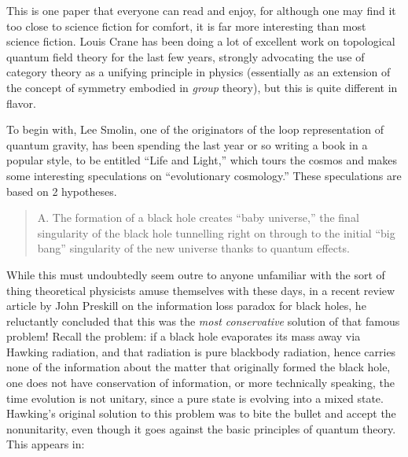 \documentclass[12pt]{article}
\def\tightlist{}
\renewcommand{\texttt}[1]{%
  \begingroup
  \ttfamily
  \begingroup\lccode`~=`/\lowercase{\endgroup\def~}{/\discretionary{}{}{}}%
  \begingroup\lccode`~=`[\lowercase{\endgroup\def~}{[\discretionary{}{}{}}%
  \begingroup\lccode`~=`.\lowercase{\endgroup\def~}{.\discretionary{}{}{}}%
  \catcode`/=\active\catcode`[=\active\catcode`.=\active
  \scantokens{#1\noexpand}%
  \endgroup
}
\begin{document}
\noindent
This is one paper that everyone can read and enjoy, for although one may
find it too close to science fiction for comfort, it is far more
interesting than most science fiction. Louis Crane has been doing a lot
of excellent work on topological quantum field theory for the last few
years, strongly advocating the use of category theory as a unifying
principle in physics (essentially as an extension of the concept of
symmetry embodied in \emph{group} theory), but this is quite different
in flavor.

To begin with, Lee Smolin, one of the originators of the loop
representation of quantum gravity, has been spending the last year or so
writing a book in a popular style, to be entitled ``Life and Light,''
which tours the cosmos and makes some interesting speculations on
``evolutionary cosmology.'' These speculations are based on 2
hypotheses.

\begin{quote}
A. The formation of a black hole creates ``baby universe,'' the final
singularity of the black hole tunnelling right on through to the initial
``big bang'' singularity of the new universe thanks to quantum effects.
\end{quote}

While this must undoubtedly seem outre to anyone unfamiliar with the
sort of thing theoretical physicists amuse themselves with these days,
in a recent review article by John Preskill on the information loss
paradox for black holes, he reluctantly concluded that this was the
\emph{most conservative} solution of that famous problem! Recall the
problem: if a black hole evaporates its mass away via Hawking radiation,
and that radiation is pure blackbody radiation, hence carries none of
the information about the matter that originally formed the black hole,
one does not have conservation of information, or more technically
speaking, the time evolution is not unitary, since a pure state is
evolving into a mixed state. Hawking's original solution to this problem
was to bite the bullet and accept the nonunitarity, even though it goes
against the basic principles of quantum theory. This appears in:
\end{document}
